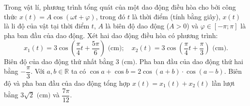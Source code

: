 \begin{ex}
	Trong vật lí, phương trình tổng quát của một dao động điều hòa cho bởi công thức $x(t) = A\cos(\omega t + \varphi)$, trong đó $t$ là thời điểm (tính bằng giây), $x(t)$ là li độ của vật tại thời điểm $t$, $A$ là biên độ dao động ($A > 0$) và $\varphi \in [-\pi; \pi]$ là pha ban đầu của dao động. Xét hai dao động điều hòa có phương trình:
	$$x_1(t) = 3\cos\left(\dfrac{\pi}{4}t + \dfrac{5\pi}{6}\right)\text{ (cm)}; \quad x_2(t) = 3\cos\left(\dfrac{\pi}{4}t + \dfrac{\pi}{3}\right)\text{ (cm)}.$$
	\choiceTFt
	{\True Biên độ của dao động thứ nhất bằng $3\text{ (cm)}$.}
	{Pha ban đầu của dao động thứ hai bằng $-\dfrac{\pi}{3}$.}
	{Với $a, b \in \mathbb{R}$ ta có $\cos a + \cos b = 2\cos(a + b)\cdot\cos(a - b)$.}
	{\True Biên độ và pha ban đầu của dao động tổng hợp $x(t) = x_1(t) + x_2(t)$ lần lượt bằng $3\sqrt{2}\text{ (cm)}$ và $\dfrac{7\pi}{12}$.}
\end{ex}

